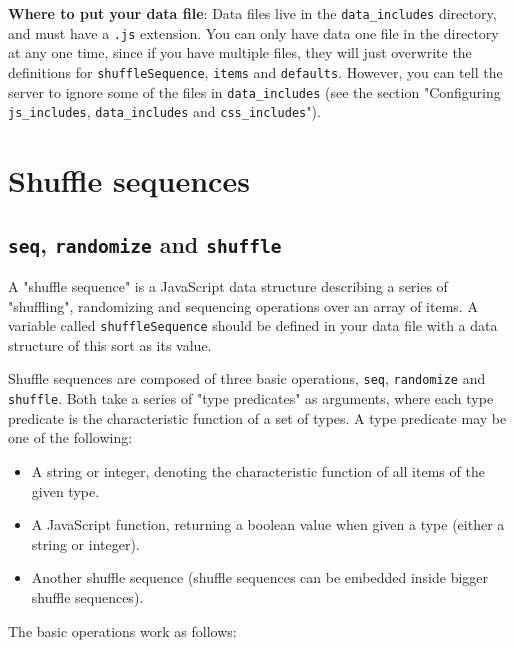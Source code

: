 \documentclass[
]{article}
\begin{document}
\textbf{Where to put your data file}: Data files live in the
\texttt{data\_includes} directory, and must have a \texttt{.js}
extension. You can only have data one file in the directory at any one
time, since if you have multiple files, they will just overwrite the
definitions for \texttt{shuffleSequence}, \texttt{items} and
\texttt{defaults}. However, you can tell the server to ignore some of
the files in \texttt{data\_includes} (see the section "Configuring
\texttt{js\_includes}, \texttt{data\_includes} and
\texttt{css\_includes}").

\hypertarget{shuffle-sequences}{%
\section{Shuffle sequences}\label{shuffle-sequences}}

\hypertarget{seq-randomize-and-shuffle}{%
\subsection{\texorpdfstring{\texttt{seq}, \texttt{randomize} and
\texttt{shuffle}}{seq, randomize and shuffle}}\label{seq-randomize-and-shuffle}}

A "shuffle sequence" is a JavaScript data structure describing a series
of "shuffling", randomizing and sequencing operations over an array of
items. A variable called \texttt{shuffleSequence} should be defined in
your data file with a data structure of this sort as its value.

Shuffle sequences are composed of three basic operations, \texttt{seq},
\texttt{randomize} and \texttt{shuffle}. Both take a series of "type
predicates" as arguments, where each type predicate is the
characteristic function of a set of types. A type predicate may be one
of the following:

\begin{itemize}
\item
  A string or integer, denoting the characteristic function of all items
  of the given type.
\item
  A JavaScript function, returning a boolean value when given a type
  (either a string or integer).
\item
  Another shuffle sequence (shuffle sequences can be embedded inside
  bigger shuffle sequences).
\end{itemize}

The basic operations work as follows:
\end{document}
